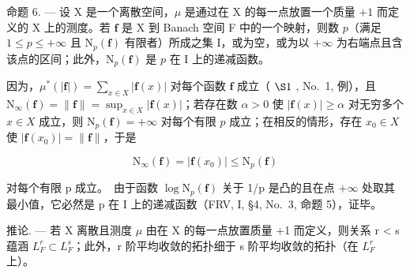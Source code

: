 命题 6. --- 设 X 是一个离散空间，\(\mu\) 是通过在 X 的每一点放置一个质量 \(+1\) 而定义的 X 上的测度。若 \(\mathbf{f}\) 是 X 到 Banach 空间 F 中的一个映射，则数 \(p\)（满足 \(1 \leqslant p \leqslant +\infty\) 且 \(\mathrm{N}_p(\mathbf{f})\) 有限者）所成之集 I，或为空，或为以 \(+\infty\) 为右端点且含该点的区间；此外，\(\mathrm{N}_p(\mathbf{f})\) 是 \(p\) 在 I 上的递减函数。

因为，\(\mu^{*}(|\mathbf{f}|) = \sum_{x\in X}|\mathbf{f}(x)|\) 对每个函数 \(\mathbf{f}\) 成立（ \(\S 1\) , No.~1, 例），且 \(\mathrm{N}_{\infty}(\mathbf{f}) = \| \mathbf{f}\| = \sup_{x\in X}|\mathbf{f}(x)|\)；若存在数 \(\alpha >0\) 使 \(|\mathbf{f}(x)|\geqslant \alpha\) 对无穷多个 \(x\in X\) 成立，则 \(\mathrm{N}_p(\mathbf{f}) = +\infty\) 对每个有限 \(p\) 成立；在相反的情形，存在 \(x_0\in X\) 使 \(|\mathbf{f}(x_0)| = \| \mathbf{f}\|\)，于是

\[
\mathrm{N} _ {\infty} (\mathbf {f}) = | \mathbf {f} (x _ {0}) | \leqslant \mathrm{N} _ {p} (\mathbf {f})
\]

对每个有限 p 成立。~由于函数 \(\log\mathrm{N}_{p}(\mathbf{f})\) 关于 1/p 是凸的且在点 \(+\infty\) 处取其最小值，它必然是 p 在 I 上的递减函数（FRV, I, §4, No.~3, 命题 5），证毕。

推论. --- 若 X 离散且测度 \(\mu\) 由在 X 的每一点放置质量 +1 而定义，则关系 r < s 蕴涵 \(L_{F}^{r} \subset L_{F}^{s}\)；此外，r 阶平均收敛的拓扑细于 s 阶平均收敛的拓扑（在 \(L_{F}^{r}\) 上）。

